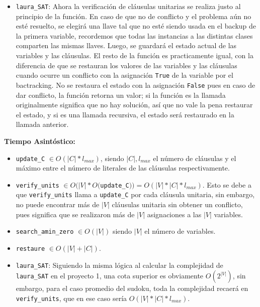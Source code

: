 \documentclass[letterpaper,12pt]{article}
\begin{document}
\begin{itemize}
	\item \texttt{laura\_SAT}: Ahora la verificaci\'on de cl\'ausulas unitarias se realiza justo al principio de la funci\'on. En caso de que no de conflicto y el problema a\'un no est\'e resuelto, se elegir\'a una llave tal que no est\'e siendo usada en el backup de la primera variable, recordemos que todas las instancias a las distintas clases comparten las mismas llaves. Luego, se guardar\'a el estado actual de las variables y las cl\'ausulas. El resto de la funci\'on es practicamente igual, con la diferencia de que se restauran los valores de las variables y las cl\'ausulas cuando ocurre un conflicto con la asignaci\'on \texttt{True} de la variable por el bactracking. No se restaura el estado con la asignaci\'on \texttt{False} pues en caso de dar conflicto, la funci\'on retorna un valor; si la funci\'on es la llamada originalmente significa que no hay soluci\'on, as\'i que no vale la pena restaurar el estado, y si es una llamada recursiva, el estado ser\'a restaurado en la llamada anterior.
\end{itemize}

\textbf{Tiempo Asintóstico:}

\begin{itemize}
	\item \texttt{update\_C} $\in O(|C|*l_{max})$, siendo $|C|, l_{max}$ el n\'umero de cl\'ausulas y el m\'aximo entre el n\'umero de literales de las cl\'ausulas respectivamente.
	
	\item \texttt{verify\_units} $\in O(|V|*O($\texttt{update\_C}$)) = O(|V|*|C|*l_{max})$. Esto se debe a que \texttt{verify\_units} llama a \texttt{update\_C} por cada cl\'ausula unitaria, sin embargo, no puede encontrar m\'as de $|V|$ cl\'ausulas unitaria sin obtener un conflicto, pues significa que se realizaron m\'as de $|V|$ asignaciones a las $|V|$ variables.
	
	\item \texttt{search\_amin\_zero} $\in O(|V|)$ siendo $|V|$ el n\'umero de variables.
	
	\item \texttt{restaure} $\in O(|V| + |C|)$. 

	\item \texttt{laura\_SAT}: Siguiendo la misma l\'ogica al calcular la complejidad de \texttt{laura\_SAT} en el proyecto 1, una cota superior es obviamente $O(2^{|V|})$, sin embargo, para el caso promedio del sudoku, toda la complejidad recaer\'a en \texttt{verify\_units}, que en ese caso ser\'ia $O(|V|*|C|*l_{max})$.
\end{itemize}
\end{document}
